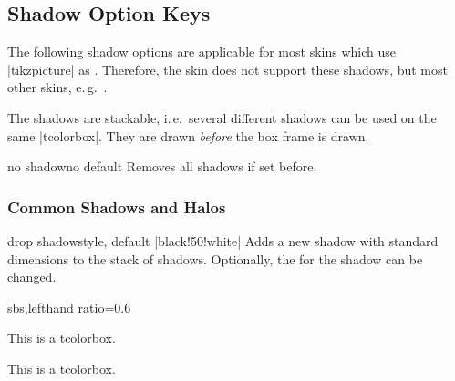 \begin{dispExample}
\begin{tcolorbox}[enhanced,colback=yellow!10!white,boxrule=0pt,frame hidden,
  borderline north={1mm}{-2mm}{red},
  borderline south={1mm}{-2mm}{blue},
  borderline west={1mm}{-2mm}{green},
  borderline east={1mm}{-2mm}{yellow}]
\lipsum[1]
\end{tcolorbox}
\end{dispExample}

\clearpage
\subsection{Shadow Option Keys}\label{subsec:shadows}
The following shadow options are applicable for most skins which
use |tikzpicture| as .
Therefore, the skin  does not support these shadows,
but most other skins, e.\,g.\ .

The shadows are stackable, i.\,e.\ several different shadows can be
used on the same |tcolorbox|. They are drawn \emph{before} the box frame is drawn.

\begin{docTcbKey}{no shadow}{}{no default}
  Removes all shadows if set before.
\end{docTcbKey}

\subsubsection{Common Shadows and Halos}

\begin{docTcbKey}{drop shadow}{}{style, default |black!50!white|}
  Adds a new shadow with standard dimensions to the stack of shadows.
  Optionally, the  for the shadow can be changed.
\begin{dispExample*}{sbs,lefthand ratio=0.6}

\begin{tcolorbox}
This is a tcolorbox.
\end{tcolorbox}\par\bigskip
\begin{tcolorbox}[title=Another shadow,
  drop shadow=blue]
This is a tcolorbox.
\end{tcolorbox}
\end{dispExample*}
\end{docTcbKey}



